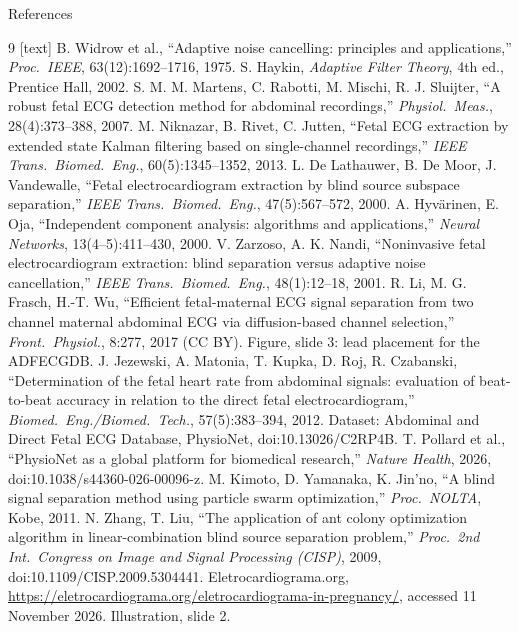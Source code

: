 \documentclass{beamer}
\begin{document}
\begin{frame}[allowframebreaks]{References}
  \tiny
  \begin{thebibliography}{9}
    [text]
     B. Widrow et al., ``Adaptive noise cancelling: principles and applications,'' \textit{Proc.\ IEEE}, 63(12):1692--1716, 1975.
     S. Haykin, \textit{Adaptive Filter Theory}, 4th ed., Prentice Hall, 2002.
     S. M. M. Martens, C. Rabotti, M. Mischi, R. J. Sluijter, ``A robust fetal ECG detection method for abdominal recordings,'' \textit{Physiol.\ Meas.}, 28(4):373--388, 2007.
     M. Niknazar, B. Rivet, C. Jutten, ``Fetal ECG extraction by extended state Kalman filtering based on single-channel recordings,'' \textit{IEEE Trans.\ Biomed.\ Eng.}, 60(5):1345--1352, 2013.
     L. De Lathauwer, B. De Moor, J. Vandewalle, ``Fetal electrocardiogram extraction by blind source subspace separation,'' \textit{IEEE Trans.\ Biomed.\ Eng.}, 47(5):567--572, 2000.
     A. Hyv\"arinen, E. Oja, ``Independent component analysis: algorithms and applications,'' \textit{Neural Networks}, 13(4--5):411--430, 2000.
     V. Zarzoso, A. K. Nandi, ``Noninvasive fetal electrocardiogram extraction: blind separation versus adaptive noise cancellation,'' \textit{IEEE Trans.\ Biomed.\ Eng.}, 48(1):12--18, 2001.
     R. Li, M. G. Frasch, H.-T. Wu, ``Efficient fetal-maternal ECG signal separation from two channel maternal abdominal ECG via diffusion-based channel selection,'' \textit{Front.\ Physiol.}, 8:277, 2017 (CC BY). Figure, slide 3: lead placement for the ADFECGDB.
     J. Jezewski, A. Matonia, T. Kupka, D. Roj, R. Czabanski, ``Determination of the fetal heart rate from abdominal signals: evaluation of beat-to-beat accuracy in relation to the direct fetal electrocardiogram,'' \textit{Biomed.\ Eng./Biomed.\ Tech.}, 57(5):383--394, 2012. Dataset: Abdominal and Direct Fetal ECG Database, PhysioNet, doi:10.13026/C2RP4B.
     T. Pollard et al., ``PhysioNet as a global platform for biomedical research,'' \textit{Nature Health}, 2026, doi:10.1038/s44360-026-00096-z.
     M. Kimoto, D. Yamanaka, K. Jin'no, ``A blind signal separation method using particle swarm optimization,'' \textit{Proc.\ NOLTA}, Kobe, 2011.
     N. Zhang, T. Liu, ``The application of ant colony optimization algorithm in linear-combination blind source separation problem,'' \textit{Proc.\ 2nd Int.\ Congress on Image and Signal Processing (CISP)}, 2009, doi:10.1109/CISP.2009.5304441.
     Eletrocardiograma.org, \url{https://eletrocardiograma.org/eletrocardiograma-in-pregnancy/}, accessed 11 November 2026. Illustration, slide 2.
  \end{thebibliography}
\end{frame}
\end{document}
